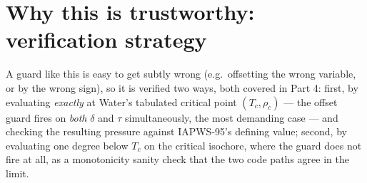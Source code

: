 \documentclass[11pt]{article}
\begin{document}
\section{Why this is trustworthy: verification strategy}

A guard like this is easy to get subtly wrong (e.g.\ offsetting the wrong
variable, or by the wrong sign), so it is verified two ways, both covered in
Part 4: first, by evaluating \emph{exactly} at Water's tabulated critical
point $(T_c, \rho_c)$ — the offset guard fires on \emph{both} $\delta$ and
$\tau$ simultaneously, the most demanding case — and checking the resulting
pressure against IAPWS-95's defining value; second, by evaluating one degree
below $T_c$ on the critical isochore, where the guard does not fire at all,
as a monotonicity sanity check that the two code paths agree in the limit.

\printbibliography
\end{document}
